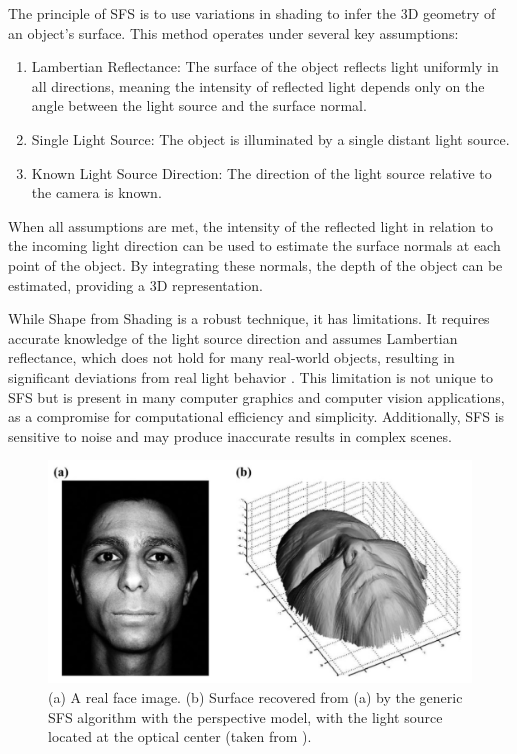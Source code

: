 The principle of SFS is to use variations in shading to infer the 3D geometry of an object's surface. This method operates under several key assumptions:

\begin{enumerate}
    \item Lambertian Reflectance: The surface of the object reflects light uniformly in all directions, meaning the intensity of reflected light depends only on the angle between the light source and the surface normal.
    \item Single Light Source: The object is illuminated by a single distant light source.
    \item Known Light Source Direction: The direction of the light source relative to the camera is known.
\end{enumerate}

When all assumptions are met, the intensity of the reflected light in relation to the incoming light direction can be used to estimate the surface normals at each point of the object. By integrating these normals, the depth of the object can be estimated, providing a 3D representation.

While Shape from Shading is a robust technique, it has limitations. It requires accurate knowledge of the light source direction and assumes Lambertian reflectance, which does not hold for many real-world objects, resulting in significant deviations from real light behavior \autocite{wolff_generalizing_1996}.
This limitation is not unique to SFS but is present in many computer graphics and computer vision applications, as a compromise for computational efficiency and simplicity.
Additionally, SFS is sensitive to noise and may produce inaccurate results in complex scenes.

\begin{figure}
    \centering
    \includegraphics[width=0.9\linewidth]{images/shape_from_shading.jpg}
    \caption{(a) A real face image. (b) Surface recovered from (a) by the generic SFS algorithm with the perspective model, with the light source located at the optical center (taken from \textcite{he_advances_2018}).}
    \label{fig:shape_from_shading}
\end{figure}

